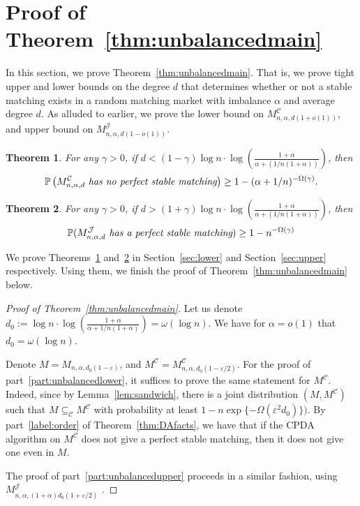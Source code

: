 \documentclass[11pt]{amsart}
\newtheorem{theorem}{Theorem}
\renewcommand{\epsilon}{\varepsilon}
\newcommand{\cal}[1]{\mathcal{#1}}
\begin{document}
 \section{Proof of Theorem~\ref{thm:unbalancedmain}}\label{sec:threshold}
In this section, we prove Theorem~\ref{thm:unbalancedmain}.  That is, we prove tight upper and lower bounds on the degree $d$ that determines whether or not a stable matching exists in a random matching market with imbalance $\alpha$ and average degree $d$. As alluded to earlier, we prove the lower bound on $M_{n,\alpha,d(1+o(1))}^{\mathcal{C}}$, and upper bound on $M_{n,\alpha,d(1-o(1))}^{\mathcal{J}}$.



\begin{theorem}\label{thm:threshlower}
For any $\gamma>0$, if $d < (1-\gamma) \log n \cdot \log \left( \frac {1 + \alpha}{\alpha + (1/n(1+\alpha))} \right)$, then 
\[
\mathbb{P}\left(M_{n, \alpha, d}^{\cal{C}}~\emph{has no perfect stable matching}\right) \geq 1 - (\alpha + 1/n)^{-\Omega(\gamma)}.
\]
\end{theorem}


\begin{theorem}\label{thm:threshupper}
 For any $\gamma > 0$, if $d > (1+\gamma) \log n \cdot \log \left( \frac {1+\alpha}{\alpha + (1/n(1+\alpha))} \right)$, then 
 \[\mathbb{P}(M_{n, \alpha, d}^{\cal{J}} \emph{ has a perfect stable matching}) \geq 1 -{n^{-\Omega(\gamma)}}\]
\end{theorem}

We prove Theorems~\ref{thm:threshlower} and~\ref{thm:threshupper} in Section~\ref{sec:lower} and Section~\ref{sec:upper} respectively.  Using them, we finish the proof of Theorem~\ref{thm:unbalancedmain} below.

\begin{proof}[Proof of Theorem~\ref{thm:unbalancedmain}]
Let us denote $d_0 := \log n\cdot \log\left(\frac{1 + \alpha}{\alpha + 1/n(1+\alpha)}\right) = \omega(\log n)$. We have for $\alpha = o(1)$ that $d_0 = \omega(\log n)$.

Denote $M = M_{n,\alpha,d_0(1 - \epsilon)}$, and $M^{\mathcal{C}} = M^{\mathcal{C}}_{n,\alpha,d_0(1- \epsilon/2)}$. For the proof of part~\ref{part:unbalancedlower}, it suffices to prove the same statement for $M^{\mathcal{C}}$. Indeed, since by Lemma~\ref{lem:sandwich}, there is a joint distribution $(M,M^{\mathcal{C}})$ such that $M\subseteq_{\mathcal{C}} M^{\mathcal{C}}$ with probability at least $1 - n\exp\{-\Omega(\epsilon^2 d_0)\})$. By part~\ref{label:order} of Theorem~\ref{thm:DAfacts}, we have that if the CPDA algorithm on $M^{\mathcal{C}}$ does not give a perfect stable matching, then it does not give one even in $M$.

The proof of part~\ref{part:unbalancedupper} proceeds in a similar fashion, using $M^{\mathcal{J}}_{n,\alpha,(1+\alpha)d_0(1 + \epsilon/2)}$ .
\end{proof}
\end{document}
